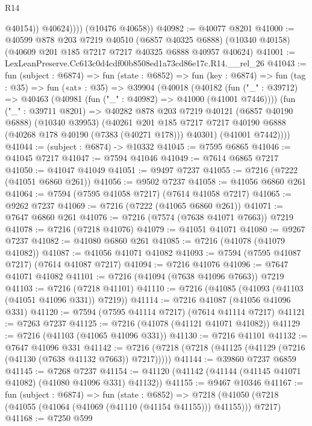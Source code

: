 \begin{lexlean}{R14}
\begin{coremodule}
                  @40154))
              @40624))))
      (@10476 @40658))
@40982 := @40077 @8201
@41000 := @40599
    @878
    @203
    @7219
    @40510
    (@6857 @40325 @6888)
    (@10340 @40158)
    (@40609 @201 @185 @7217 @7217 @40325 @6888 @40957 @40624)
@41001 := LexLeanPreserve.Cc613c0d4cdf00b8508ed1a73cd86e17c.R14.__rel_26
@41043 := fun (subject : @6874) =>
  fun (state : @6852) =>
  fun (key : @6874) =>
  fun (tag : @35) =>
  fun («at» : @35) =>
  @39904
    (@40018
      (@40182
        (fun ("_" : @39712) => @40463 (@40981 (fun ("_" : @40982) => @41000 (@41001 @7446))))
        (fun ("_" : @39711 @8201) =>
        @40282
          @878
          @203
          @7219
          @40121
          (@6857 @40190 @6888)
          (@10340 @39953)
          (@40261
            @201
            @185
            @7217
            @7217
            @40190
            @6888
            (@40268 @178 @40190 (@7383 (@40271 @178)))
            @40301)
          (@41001 @7442))))
@41044 := (subject : @6874) -> @10332
@41045 := @7595 @6865
@41046 := @41045 @7217
@41047 := @7594 @41046
@41049 := @7614 @6865 @7217
@41050 := @41047 @41049
@41051 := @9497 @7237
@41055 := @7216 (@7222 (@41051 @6860 @261))
@41056 := @9502 @7237
@41058 := @41056 @6860 @261
@41064 := @7594 (@7595 @41058 @7217) (@7614 @41058 @7217)
@41065 := @9262 @7237
@41069 := @7216 (@7222 (@41065 @6860 @261))
@41071 := @7647 @6860 @261
@41076 := @7216 (@7574 (@7638 @41071 @7663)) @7219
@41078 := @7216 (@7218 @41076)
@41079 := @41051 @41071
@41080 := @9267 @7237
@41082 := @41080 @6860 @261
@41085 := @7216 (@41078 (@41079 @41082))
@41087 := @41056 @41071 @41082
@41093 := @7594 (@7595 @41087 @7217) (@7614 @41087 @7217)
@41094 := @7216 @41076
@41096 := @7647 @41071 @41082
@41101 := @7216 (@41094 (@7638 @41096 @7663)) @7219
@41103 := @7216 (@7218 @41101)
@41110 := @7216 (@41085 (@41093 (@41103 (@41051 @41096 @331)) @7219))
@41114 := @7216 @41087 (@41056 @41096 @331)
@41120 := @7594 (@7595 @41114 @7217) (@7614 @41114 @7217)
@41121 := @7263 @7237
@41125 := @7216 (@41078 (@41121 @41071 @41082))
@41129 := @7216 (@41103 (@41065 @41096 @331))
@41130 := @7216 @41101
@41132 := @7647 @41096 @331
@41142 := @7216 (@7218 (@7218 (@41125 (@41129 (@7216 (@41130 (@7638 @41132 @7663)) @7217)))))
@41144 := @39860 @7237 @6859
@41145 := @7268 @7237
@41154 := @41120 (@41142 (@41144 (@41145 @41071 @41082) (@41080 @41096 @331) @41132))
@41155 := @9467 @10346
@41167 := fun (subject : @6874) =>
  fun (state : @6852) =>
  @7218 (@41050 (@7218 (@41055 (@41064 (@41069 (@41110 (@41154 @41155))) @41155))) @7217)
@41168 := @7250 @599

\end{coremodule}
\end{lexlean}
